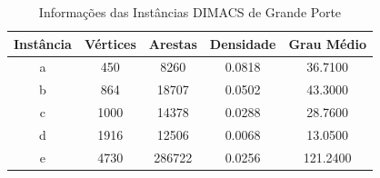 \begin{table}[H]
\centering
\caption{Informações das Instâncias DIMACS de Grande Porte}
\label{tab:informacoes_dimacs_2}
\begin{tabular}{ccccc}
\toprule
Instância & Vértices & Arestas & Densidade & Grau Médio \\
\midrule
a & 450 & 8260 & 0.0818 & 36.7100 \\
b & 864 & 18707 & 0.0502 & 43.3000 \\
c & 1000 & 14378 & 0.0288 & 28.7600 \\
d & 1916 & 12506 & 0.0068 & 13.0500 \\
e & 4730 & 286722 & 0.0256 & 121.2400 \\
\bottomrule
\end{tabular}
\end{table}
